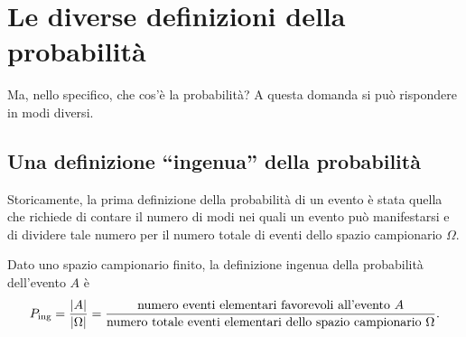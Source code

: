 
\section{Le diverse definizioni della probabilità}

Ma, nello specifico, che cos'è la probabilità?
A questa domanda si può rispondere in modi diversi.

\subsection{Una definizione \enquote{ingenua} della probabilità}
\label{sec:def_ing_prob}

Storicamente, la prima definizione della probabilità di un evento è stata quella che richiede di contare il numero di modi nei quali un evento può manifestarsi e di dividere tale numero per il numero totale di eventi dello spazio campionario $\Omega$.
\begin{defn}
\label{def_ing_prob}
Dato uno spazio campionario finito, la definizione ingenua della probabilità dell'evento $A$ è
\begin{align}
P_{\text{ing}} = \frac{|A|}{|\Omega|}
= \frac{\text{numero eventi elementari favorevoli all'evento }A}{\text{numero totale  eventi elementari dello spazio campionario }\Omega}.\notag
\end{align}

\end{defn}

